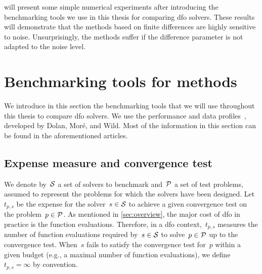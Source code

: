  will present some simple numerical experiments after introducing the benchmarking tools we use in this thesis for comparing \gls{dfo} solvers.
These results will demonstrate that the methods based on finite differences are highly sensitive to noise.
Unsurprisingly, the methods suffer if the difference parameter is not adapted to the noise level.

\section{Benchmarking tools for  methods}
\label{sec:benchmarking-tools}

We introduce in this section the benchmarking tools that we will use throughout this thesis to compare \gls{dfo} solvers.
We use the performance and data profiles~\cite{Dolan_More_2002,More_Wild_2009}, developed by Dolan, Mor{\'{e}}, and Wild.
Most of the information in this section can be found in the aforementioned articles.

\subsection{Expense measure and convergence test}
\label{subsec:convergence-test}

We denote by~$\mathcal{S}$ a set of solvers to benchmark and~$\mathcal{P}$ a set of test problems, assumed to represent the problems for which the solvers have been designed.
Let~$t_{p, s}$ be the expense for the solver~$s \in \mathcal{S}$ to achieve a given convergence test on the problem~$p \in \mathcal{P}$.
As mentioned in \cref{sec:overview}, the major cost of \gls{dfo} in practice is the function evaluations.
Therefore, in a \gls{dfo} context,~$t_{p, s}$ measures the number of function evaluations required by~$s \in \mathcal{S}$ to solve~$p \in \mathcal{P}$ up to the convergence test.
When~$s$ fails to satisfy the convergence test for~$p$ within a given budget (e.g., a maximal number of function evaluations), we define~$t_{p, s} = \infty$ by convention.

